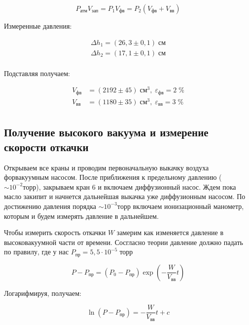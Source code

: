 \documentclass[a4paper, 12pt]{article}
\begin{document}
\bigskip

\begin{equation}
	P_{\text{атм}}V_{\text{зап}}=P_1V_{\text{фв}}=P_2(V_{\text{фв}}+V_{\text{вв}})
\end{equation}

Измеренные давления:


\begin{align}
	\Delta h_1=(26,3 \pm 0,1) \; \text{см} \\
	\Delta h_2=(17,1 \pm 0,1) \; \text{см} \\
\end{align}

Подставляя получаем:

\begin{align}
	V_{\text{фв}} &= (2192 \pm 45) \; \text{см}^3, \; \varepsilon_{\text{фв}} = 2 \; \% \\
	V_{\text{вв}} &= (1180 \pm 35) \; \text{см}^3, \; \varepsilon_{\text{вв}} = 3 \; \% \\
\end{align}

\subsection*{Получение высокого вакуума и измерение скорости откачки}

Открываем все краны и проводим первоначальную выкачку воздуха форвакуумным насосом. После приближения к предельному давлению ($\sim 10^{-2}торр$), закрываем кран 6 и включаем диффузионный насос. Ждем пока масло закипит и начнется дальнейшая выкачка уже диффузионным насосом. По достижению давления порядка $\sim 10^{-3}торр$ включаем ионизационный манометр, которым и будем измерять давление в дальнейшем.

Чтобы измерить скорость откачки $W$ замерим как изменяется давление в высоковакуумной части от времени. Сосгласно теории давление должно падать по правилу, где у нас $P_{\text{пр}}=5,5\cdot10^{-5} \; \text{торр}$

\begin{equation}
    P-P_{\text{пр}}=(P_0 - P_{\text{пр}})\exp\left(-\frac{W}{V_{\text{вв}}}t\right)
\end{equation}

Логарифмируя, получаем:

\begin{equation}
    \ln(P-P_{\text{пр}})=-\frac{W}{V_{\text{вв}}}t + c
    \label{linearized}
\end{equation}
\end{document}
